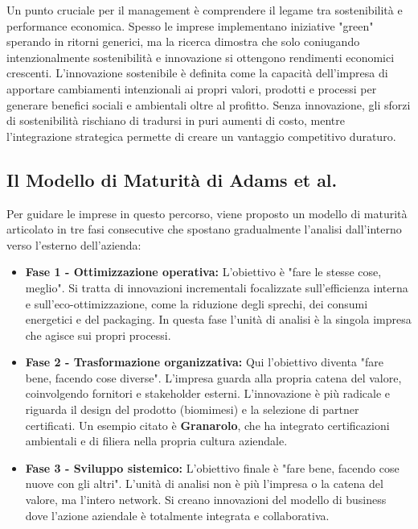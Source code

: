 \documentclass[a4paper,10pt]{article}
\begin{document}
Un punto cruciale per il management è comprendere il legame tra sostenibilità e performance economica. Spesso le imprese implementano iniziative "green" sperando in ritorni generici, ma la ricerca dimostra che solo coniugando intenzionalmente sostenibilità e innovazione si ottengono rendimenti economici crescenti. L'innovazione sostenibile è definita come la capacità dell'impresa di apportare cambiamenti intenzionali ai propri valori, prodotti e processi per generare benefici sociali e ambientali oltre al profitto. Senza innovazione, gli sforzi di sostenibilità rischiano di tradursi in puri aumenti di costo, mentre l'integrazione strategica permette di creare un vantaggio competitivo duraturo.

\subsection*{Il Modello di Maturità di Adams et al.}

Per guidare le imprese in questo percorso, viene proposto un modello di maturità articolato in tre fasi consecutive che spostano gradualmente l'analisi dall'interno verso l'esterno dell'azienda:

\begin{itemize}
    \item \textbf{Fase 1 - Ottimizzazione operativa:} L'obiettivo è "fare le stesse cose, meglio". Si tratta di innovazioni incrementali focalizzate sull'efficienza interna e sull'eco-ottimizzazione, come la riduzione degli sprechi, dei consumi energetici e del packaging. In questa fase l'unità di analisi è la singola impresa che agisce sui propri processi.
    \item \textbf{Fase 2 - Trasformazione organizzativa:} Qui l'obiettivo diventa "fare bene, facendo cose diverse". L'impresa guarda alla propria catena del valore, coinvolgendo fornitori e stakeholder esterni. L'innovazione è più radicale e riguarda il design del prodotto (biomimesi) e la selezione di partner certificati. Un esempio citato è \textbf{Granarolo}, che ha integrato certificazioni ambientali e di filiera nella propria cultura aziendale.
    \item \textbf{Fase 3 - Sviluppo sistemico:} L'obiettivo finale è "fare bene, facendo cose nuove con gli altri". L'unità di analisi non è più l'impresa o la catena del valore, ma l'intero network. Si creano innovazioni del modello di business dove l'azione aziendale è totalmente integrata e collaborativa.
\end{itemize}
\end{document}
